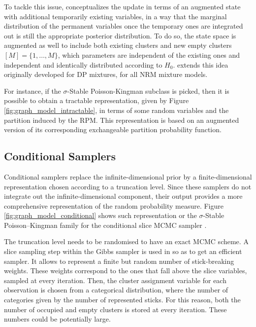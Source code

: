 To tackle this issue, \cite{Neal:2000hb} conceptualizes the update in terms of an augmented state with additional temporarily existing variables, in a way that the marginal distribution of the permanent variables once the temporary ones are integrated out is still the appropriate posterior distribution.
To do so, the state space is augmented as well to include both existing clusters and new empty clusters $[M] = \{1, \dots , M\}$, which parameters are independent of the existing ones and independent and identically distributed according to $H_0$.
\cite{Favaro:2013fl} extends this idea originally developed for \gls{DP} mixtures, for all \gls{NRM} mixture models.

For instance, if the $\sigma$-Stable Poisson-Kingman subclass is picked, then it is possible to obtain a tractable representation, given by Figure \ref{fig:graph_model_intractable}, in terms of some random variables and the partition induced by the \gls{RPM}.
This representation is based on an augmented version of its corresponding exchangeable partition probability function.

\subsection{Conditional Samplers}

Conditional samplers replace the infinite-dimensional prior by a finite-dimensional representation chosen according to a truncation level. Since these samplers do not integrate out the infinite-dimensional component, their output provides a more comprehensive representation of the random probability measure.
Figure \ref{fig:graph_model_conditional} shows such representation or the $\sigma$-Stable Poisson–Kingman
family for the conditional slice \gls{MCMC} sampler \cite{FavaroWalker2012}.

The truncation level needs to be randomised to have an exact \gls{MCMC} scheme. A slice sampling step \cite{neal2003} within the Gibbs sampler is used in \cite{Favaro:2013fl} so as to get an efficient sampler.
It allows to represent a finite but random number of stick-breaking weights. These weights correspond to the ones that fall above the slice variables, sampled at every iteration. Then, the cluster assignment variable for each observation is chosen from a categorical distribution, where the number of categories given by the number of represented sticks. For this reason, both the number of occupied and empty clusters is stored at every iteration. These numbers could be potentially large.

